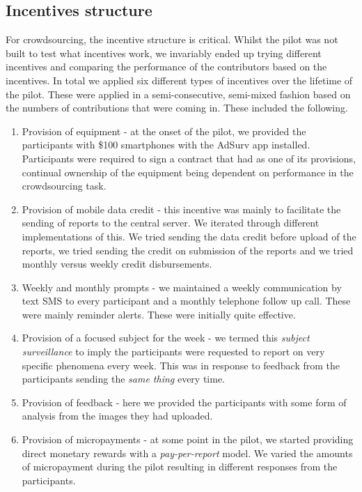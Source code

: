 \documentclass[letterpaper]{article} %
\begin{document}
\subsection{Incentives structure}
For crowdsourcing, the incentive structure is critical. Whilst the pilot was not built to test what incentives work, we invariably ended up trying different incentives and comparing the performance of the contributors based on the incentives. In total we applied six different types of incentives over the lifetime of the pilot. These were applied in a semi-consecutive, semi-mixed fashion based on the numbers of contributions that were coming in. These included the following.
\begin{enumerate}
\item Provision of equipment - at the onset of the pilot, we provided the participants with \$100 smartphones with the AdSurv app installed. Participants were required to sign a contract that had as one of its provisions, continual ownership of the equipment being dependent on performance in the crowdsourcing task.
\item Provision of mobile data credit - this incentive was mainly to facilitate the sending of reports to the central server. We iterated through different implementations of this. We tried sending the data credit before upload of the reports, we tried sending the credit on submission of the reports and we tried monthly versus weekly credit disbursements.
\item Weekly and monthly prompts - we maintained a weekly communication by text SMS to every participant and a monthly telephone follow up call. These were mainly reminder alerts. These were initially quite effective.
\item Provision of a focused subject for the week - we termed this \emph{subject surveillance} to imply the participants were requested to report on very specific phenomena every week. This was in response to feedback from the participants sending the \emph{same thing} every time.
\item Provision of feedback - here we provided the participants with some form of analysis from the images they had uploaded.
\item Provision of micropayments - at some point in the pilot, we started providing direct monetary rewards with a \emph{pay-per-report} model. We varied the amounts of micropayment during the pilot resulting in different responses from the participants.
\end{enumerate}
\end{document}
